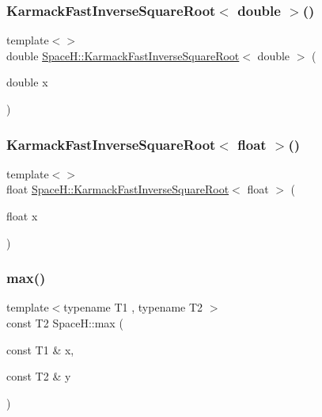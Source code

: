 \subsubsection{\texorpdfstring{Karmack\+Fast\+Inverse\+Square\+Root$<$ double $>$()}{KarmackFastInverseSquareRoot< double >()}}
{\footnotesize\ttfamily template$<$$>$ \\
double \mbox{\hyperlink{namespace_space_h_a6f9186645e56cf594b0313cb4dcdfcaf}{Space\+H\+::\+Karmack\+Fast\+Inverse\+Square\+Root}}$<$ double $>$ (\begin{DoxyParamCaption}\item[{double}]{x }\end{DoxyParamCaption})\hspace{0.3cm}{\ttfamily [inline]}}

\mbox{\label{namespace_space_h_a69962a0b8bd4fdde5ac11186edf6e70c}} 
\subsubsection{\texorpdfstring{Karmack\+Fast\+Inverse\+Square\+Root$<$ float $>$()}{KarmackFastInverseSquareRoot< float >()}}
{\footnotesize\ttfamily template$<$$>$ \\
float \mbox{\hyperlink{namespace_space_h_a6f9186645e56cf594b0313cb4dcdfcaf}{Space\+H\+::\+Karmack\+Fast\+Inverse\+Square\+Root}}$<$ float $>$ (\begin{DoxyParamCaption}\item[{float}]{x }\end{DoxyParamCaption})\hspace{0.3cm}{\ttfamily [inline]}}

\mbox{\label{namespace_space_h_aacd80a06ba9a8b2381301a3917d79cbe}} 
\subsubsection{\texorpdfstring{max()}{max()}}
{\footnotesize\ttfamily template$<$typename T1 , typename T2 $>$ \\
const T2 Space\+H\+::max (\begin{DoxyParamCaption}\item[{const T1 \&}]{x,  }\item[{const T2 \&}]{y }\end{DoxyParamCaption})\hspace{0.3cm}{\ttfamily [inline]}}



